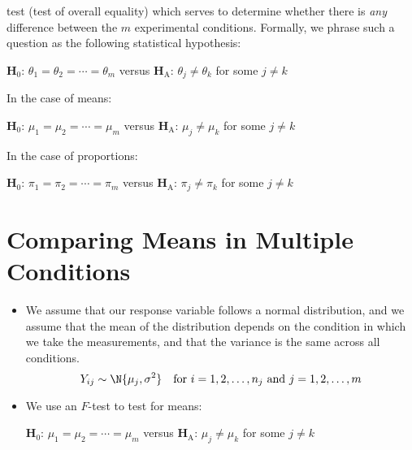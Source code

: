 \begin{itemize}
          test (test of overall equality) which serves to determine whether
          there is \emph{any} difference between the $ m $ experimental conditions.
          Formally, we phrase such a question as the following statistical hypothesis:
          \begin{tightcenter}
              $ \mathbf{H}_0 $: $ \theta_1=\theta_2=\cdots=\theta_m $ versus $ \mathbf{H}_\text{A} $: $ \theta_j\ne \theta_k $ for some $ j\ne k $
          \end{tightcenter}
          In the case of means:
          \begin{tightcenter}
              $ \mathbf{H}_0 $: $ \mu_1=\mu_2=\cdots=\mu_m $ versus $ \mathbf{H}_\text{A} $: $ \mu_j\ne \mu_k $ for some $ j\ne k $
          \end{tightcenter}
          In the case of proportions:
          \begin{tightcenter}
              $ \mathbf{H}_0 $: $ \pi_1=\pi_2=\cdots=\pi_m $ versus $ \mathbf{H}_\text{A} $: $ \pi_j\ne \pi_k $ for some $ j\ne k $
          \end{tightcenter}
\end{itemize}
\section{Comparing Means in Multiple Conditions}
\begin{itemize}
    \item We assume that our response variable follows a normal distribution,
          and we assume that the mean of the distribution depends on the condition
          in which we take the measurements, and that the variance
          is the same across all conditions.
          \[ Y_{ij}\sim \N{\mu_j,\sigma^2}\quad\text{for }i=1,2,\ldots,n_j\text{ and }j=1,2,\ldots,m \]
    \item We use an $ F $-test to test for means:
          \begin{tightcenter}
              $ \mathbf{H}_0 $: $ \mu_1=\mu_2=\cdots=\mu_m $ versus $\mathbf{H}_\text{A}$: $ \mu_j\ne \mu_k $ for some $ j\ne k $
          \end{tightcenter}
\end{itemize}
